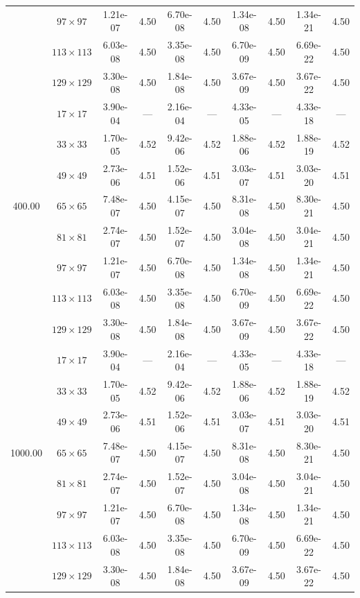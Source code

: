 \documentclass[preprint, 12pt]{elsarticle}
\begin{document}
\begin{center}
\begin{table}[H]
{\begin{tabular*}{\textwidth}{@{\extracolsep\fill}cccccccccc@{}}
    & $97\times 97$ & 1.21e-07 & 4.50 & 6.70e-08 & 4.50 & 1.34e-08 & 4.50 & 1.34e-21 & 4.50 \\
    & $113\times 113$ & 6.03e-08 & 4.50 & 3.35e-08 & 4.50 & 6.70e-09 & 4.50 & 6.69e-22 & 4.50 \\
    & $129\times 129$ & 3.30e-08 & 4.50 & 1.84e-08 & 4.50 & 3.67e-09 & 4.50 & 3.67e-22 & 4.50 \\
    \hline\hline
    \multirow{7}{*}{400.00} & $17\times 17$ & 3.90e-04 & --- & 2.16e-04 & --- & 4.33e-05 & --- & 4.33e-18 & --- \\
    & $33\times 33$ & 1.70e-05 & 4.52 & 9.42e-06 & 4.52 & 1.88e-06 & 4.52 & 1.88e-19 & 4.52 \\
    & $49\times 49$ & 2.73e-06 & 4.51 & 1.52e-06 & 4.51 & 3.03e-07 & 4.51 & 3.03e-20 & 4.51 \\
    & $65\times 65$ & 7.48e-07 & 4.50 & 4.15e-07 & 4.50 & 8.31e-08 & 4.50 & 8.30e-21 & 4.50 \\
    & $81\times 81$ & 2.74e-07 & 4.50 & 1.52e-07 & 4.50 & 3.04e-08 & 4.50 & 3.04e-21 & 4.50 \\
    & $97\times 97$ & 1.21e-07 & 4.50 & 6.70e-08 & 4.50 & 1.34e-08 & 4.50 & 1.34e-21 & 4.50 \\
    & $113\times 113$ & 6.03e-08 & 4.50 & 3.35e-08 & 4.50 & 6.70e-09 & 4.50 & 6.69e-22 & 4.50 \\
    & $129\times 129$ & 3.30e-08 & 4.50 & 1.84e-08 & 4.50 & 3.67e-09 & 4.50 & 3.67e-22 & 4.50 \\
    \hline\hline
    \multirow{7}{*}{1000.00} & $17\times 17$ & 3.90e-04 & --- & 2.16e-04 & --- & 4.33e-05 & --- & 4.33e-18 & --- \\
    & $33\times 33$ & 1.70e-05 & 4.52 & 9.42e-06 & 4.52 & 1.88e-06 & 4.52 & 1.88e-19 & 4.52 \\
    & $49\times 49$ & 2.73e-06 & 4.51 & 1.52e-06 & 4.51 & 3.03e-07 & 4.51 & 3.03e-20 & 4.51 \\
    & $65\times 65$ & 7.48e-07 & 4.50 & 4.15e-07 & 4.50 & 8.31e-08 & 4.50 & 8.30e-21 & 4.50 \\
    & $81\times 81$ & 2.74e-07 & 4.50 & 1.52e-07 & 4.50 & 3.04e-08 & 4.50 & 3.04e-21 & 4.50 \\
    & $97\times 97$ & 1.21e-07 & 4.50 & 6.70e-08 & 4.50 & 1.34e-08 & 4.50 & 1.34e-21 & 4.50 \\
    & $113\times 113$ & 6.03e-08 & 4.50 & 3.35e-08 & 4.50 & 6.70e-09 & 4.50 & 6.69e-22 & 4.50 \\
    & $129\times 129$ & 3.30e-08 & 4.50 & 1.84e-08 & 4.50 & 3.67e-09 & 4.50 & 3.67e-22 & 4.50 \\
    \hline
    \end{tabular*}
}
\end{table}
\end{center}
\end{document}
